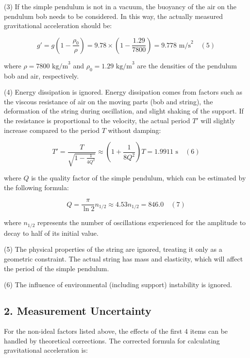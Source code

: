 \documentclass{report}
\begin{document}
(3) If the simple pendulum is not in a vacuum, the buoyancy of the air on the pendulum bob needs to be considered. In this way, the actually measured gravitational acceleration should be:

\begin{equation}
    g' = g \left( 1 - \frac{\rho_0}{\rho} \right) = 9.78 \times \left( 1 - \frac{1.29}{7800} \right) = 9.778 \text{ m/s}^2 \quad (5)
\end{equation}

where \(\rho=7800 \text{ kg/m}^3\) and \(\rho_0=1.29 \text{ kg/m}^3\) are the densities of the pendulum bob and air, respectively.

(4) Energy dissipation is ignored. Energy dissipation comes from factors such as the viscous resistance of air on the moving parts (bob and string), the deformation of the string during oscillation, and slight shaking of the support. If the resistance is proportional to the velocity, the actual period \(T'\) will slightly increase compared to the period \(T\) without damping:

\begin{equation}
    T' = \frac{T}{\sqrt{1 - \frac{1}{4Q^2}}} \approx \left( 1 + \frac{1}{8Q^2} \right) T = 1.9911 \text{ s} \quad (6)
\end{equation}

where \(Q\) is the quality factor of the simple pendulum, which can be estimated by the following formula:

\begin{equation}
    Q = \frac{\pi}{\ln 2} n_{1/2} \approx 4.53 n_{1/2} = 846.0 \quad (7)
\end{equation}

where \(n_{1/2}\) represents the number of oscillations experienced for the amplitude to decay to half of its initial value.

(5) The physical properties of the string are ignored, treating it only as a geometric constraint. The actual string has mass and elasticity, which will affect the period of the simple pendulum.

(6) The influence of environmental (including support) instability is ignored.

\subsection*{2. Measurement Uncertainty}

For the non-ideal factors listed above, the effects of the first 4 items can be handled by theoretical corrections. The corrected formula for calculating gravitational acceleration is:
\end{document}
